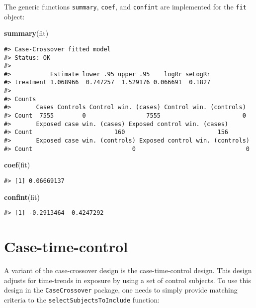 \documentclass[]{article}
\newenvironment{Shaded}{\begin{snugshade}}{\end{snugshade}}
\newcommand{\KeywordTok}[1]{\textcolor[rgb]{0.13,0.29,0.53}{\textbf{#1}}}
\newcommand{\NormalTok}[1]{#1}
\begin{document}
The generic functions \texttt{summary}, \texttt{coef}, and
\texttt{confint} are implemented for the \texttt{fit} object:

\begin{Shaded}
\begin{Highlighting}[]
\KeywordTok{summary}\NormalTok{(fit)}
\end{Highlighting}
\end{Shaded}

\begin{verbatim}
#> Case-Crossover fitted model
#> Status: OK
#> 
#>           Estimate lower .95 upper .95    logRr seLogRr
#> treatment 1.068966  0.747257  1.529176 0.066691  0.1827
#> 
#> Counts
#>       Cases Controls Control win. (cases) Control win. (controls)
#> Count  7555        0                 7555                       0
#>       Exposed case win. (cases) Exposed control win. (cases)
#> Count                       160                          156
#>       Exposed case win. (controls) Exposed control win. (controls)
#> Count                            0                               0
\end{verbatim}

\begin{Shaded}
\begin{Highlighting}[]
\KeywordTok{coef}\NormalTok{(fit)}
\end{Highlighting}
\end{Shaded}

\begin{verbatim}
#> [1] 0.06669137
\end{verbatim}

\begin{Shaded}
\begin{Highlighting}[]
\KeywordTok{confint}\NormalTok{(fit)}
\end{Highlighting}
\end{Shaded}

\begin{verbatim}
#> [1] -0.2913464  0.4247292
\end{verbatim}

\hypertarget{case-time-control}{%
\section{Case-time-control}\label{case-time-control}}

A variant of the case-crossover design is the case-time-control design.
This design adjusts for time-trends in exposure by using a set of
control subjects. To use this design in the \texttt{CaseCrossover}
package, one needs to simply provide matching criteria to the
\texttt{selectSubjectsToInclude} function:
\end{document}
